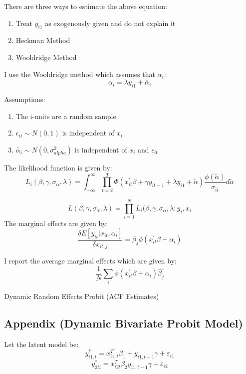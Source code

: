 \documentclass[12pt]{article}
\begin{document}
There are three ways to estimate the above equation: 
\begin{enumerate}
\item Treat $y_{i1}$ as exogenously given and do not explain it
\item Heckman Method
\item Wooldridge Method
\end{enumerate} 
I use the Wooldridge method which assumes that $\alpha_{i}$:
$$\alpha_{i} = \lambda y_{i1} + \tilde{\alpha_{i}}$$

Assumptions: 

\begin{enumerate}
\item The i-units are a random sample
\item $\epsilon_{it} \sim N(0,1)$ is independent of $x_{i}$
\item $\tilde{\alpha_{i}} \sim N(0,\sigma_{alpha}^{2})$ is independent of
  $x_{i}$ and $\epsilon_{it}$
\end{enumerate}

The likelihood function is given by:
$$ L_{i}(\beta, \gamma, \sigma_{\alpha},\lambda)= \int_{-\infty}^{\infty}
\prod_{t=2}^{T}\Phi(x^{'}_{it}\beta + \gamma y_{it-1} + \lambda y_{i1} +
\tilde{\alpha}) \frac{\phi(\tilde{\alpha})}{\sigma_{\tilde{\alpha}}}
d\tilde{\alpha}$$ 

$$ L(\beta, \gamma, \sigma_{\alpha},\lambda) = \prod_{i=1}^{N}L_{i}(\beta, \gamma, \sigma_{\alpha},\lambda:y_{i},x_{i}$$
The marginal effects are given by:
\begin{equation}
\frac{\delta E[y_{it}|x_{it}, \alpha_{i}]}{\delta x_{it,j}} =
\beta_{j}\phi(x_{it}^{'} \beta + \alpha_{i})
\end{equation}

I report the average marginal effects which are given by: 
$$ \frac{1}{N} \sum_{i}\phi( x_{it}^{'} \beta + \alpha_{i})
\hat{\beta_{j}}$$


\begin{center}
\begin{table}[H]
\caption{Dynamic Random Effects Probit (ACF Estimates)}
\label{tab:dynprobitacf}

\end{table}
\end{center}

\subsection{Appendix (Dynamic Bivariate Probit Model)}
Let the latent model be: 
$$y^{*}_{i1,t}= x_{i1,t}^{T}\beta_{1} + y_{i1,t-1}\gamma + \varepsilon_{i1}$$
$$y^{*}_{2ti}= x_{i2t}^{T}\beta_{2}y_{i1,t-1}\gamma + \varepsilon_{i2}$$
\end{document}

